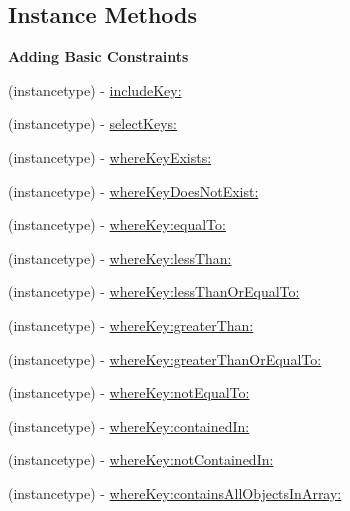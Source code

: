 \subsection*{Instance Methods}
\begin{Indent}{\bf Adding Basic Constraints}\par
{\em 

 

 }\begin{DoxyCompactItemize}
\item 
(instancetype) -\/ \hyperlink{interface_p_f_query_abd2e3ea3e83aef4392b228f80ecedb9b}{include\+Key\+:}
\item 
(instancetype) -\/ \hyperlink{interface_p_f_query_a76d982a5990d3308274d965aaa4d48af}{select\+Keys\+:}
\item 
(instancetype) -\/ \hyperlink{interface_p_f_query_ac93bb5470d060c87ab1edb2a9287a6ba}{where\+Key\+Exists\+:}
\item 
(instancetype) -\/ \hyperlink{interface_p_f_query_accb6619ba929837ef5fc2d5b0e1ca5d5}{where\+Key\+Does\+Not\+Exist\+:}
\item 
(instancetype) -\/ \hyperlink{interface_p_f_query_a51ee07d046e5639dfddb957a99c4da55}{where\+Key\+:equal\+To\+:}
\item 
(instancetype) -\/ \hyperlink{interface_p_f_query_a77417ab3fb199edd5b4b5649bf7b2097}{where\+Key\+:less\+Than\+:}
\item 
(instancetype) -\/ \hyperlink{interface_p_f_query_ad71ec837cecf3de53ed638b6a8ef8b5d}{where\+Key\+:less\+Than\+Or\+Equal\+To\+:}
\item 
(instancetype) -\/ \hyperlink{interface_p_f_query_ac4e8be97b6bd75e9a7c0dd0915661f3f}{where\+Key\+:greater\+Than\+:}
\item 
(instancetype) -\/ \hyperlink{interface_p_f_query_a7057c8c672b23e79c430ab45cde6ccf5}{where\+Key\+:greater\+Than\+Or\+Equal\+To\+:}
\item 
(instancetype) -\/ \hyperlink{interface_p_f_query_a356fff65dd8a6742e076dac97ff4f989}{where\+Key\+:not\+Equal\+To\+:}
\item 
(instancetype) -\/ \hyperlink{interface_p_f_query_ae00659ed9e8de759ccbbc9782e51689b}{where\+Key\+:contained\+In\+:}
\item 
(instancetype) -\/ \hyperlink{interface_p_f_query_a605c41af4961000b3f4bc84983e89a38}{where\+Key\+:not\+Contained\+In\+:}
\item 
(instancetype) -\/ \hyperlink{interface_p_f_query_a3cd005764242a368f0d59e621968ae8f}{where\+Key\+:contains\+All\+Objects\+In\+Array\+:}
\end{DoxyCompactItemize}
\end{Indent}
